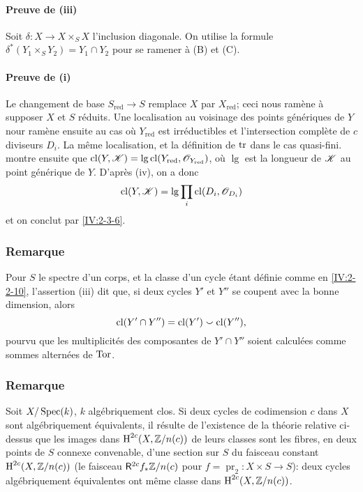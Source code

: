\paragraph{Preuve de (iii)}
Soit $\delta:X\to X\times_S X$ l'inclusion diagonale. On utilise la formule 
$\delta^\ast(Y_1\times_S Y_2) = Y_1\cap Y_2$ pour se ramener à 
(B) et (C). 

\paragraph{Preuve de (i)}
Le changement de base $S_\text{red}\to S$ remplace $X$ par $X_\text{red}$; ceci 
nous ramène à supposer $X$ et $S$ réduits. Une localisation au voisinage 
des points génériques de $Y$ nour ramène ensuite au cas où 
$Y_\text{red}$ est irréductibles et l'intersection complète de $c$ 
diviseurs $D_i$. La même localisation, et la définition de $\operatorname{tr}$ dans le 
cas quasi-fini. montre ensuite que 
$\operatorname{cl}(Y,\mathscr{K})=\operatorname{lg}\operatorname{cl}(Y_\text{red},\mathscr{O}_{Y_\text{red}})$, où 
$\operatorname{lg}$ est la longueur de $\mathscr{K}$ au point générique de $Y$. 
D'après (iv), on a donc 
\[
  \operatorname{cl}(Y,\mathscr{K}) = \operatorname{lg} \prod_i \operatorname{cl}(D_i,\mathscr{O}_{D_i})
\]
et on conclut par \ref{IV:2-3-6}. 





\subsubsection{Remarque}\label{IV:2-3-9}

Pour $S$ le spectre d'un corps, et la classe d'un cycle étant définie comme 
en \ref{IV:2-2-10}, l'assertion (iii) dit que, si deux cycles $Y'$ et $Y''$ se 
coupent avec la bonne dimension, alors 
\[
  \operatorname{cl}(Y'\cap Y'') = \operatorname{cl}(Y')\smallsmile \operatorname{cl}(Y'')\text{,}
\]
pourvu que les multiplicités des composantes de $Y'\cap Y''$ soient 
calculées comme sommes alternées de $\operatorname{Tor}$. 





\subsubsection{Remarque}\label{IV:2-3-10}

Soit $X/\operatorname{Spec}(k)$, $k$ algébriquement clos. Si deux cycles de codimension $c$ 
dans $X$ sont algébriquement équivalents, il résulte de l'existence de la 
théorie relative ci-dessus que les images dans $\operatorname{H}^{2 c}(X,\mathbb{Z}/n(c))$ de 
leurs classes sont les fibres, en deux points de $S$ connexe convenable, d'une 
section sur $S$ du faisceau constant $\operatorname{H}^{2 c}(X,\mathbb{Z}/n(c))$ (le faisceau 
$\mathsf{R}^{2 c} f_\ast \mathbb{Z}/n(c)$ pour $f=\operatorname{pr}_2:X\times S\to S$): deux 
cycles algébriquement équivalentes ont même classe dans 
$\operatorname{H}^{2 c}(X,\mathbb{Z}/n(c))$. 




















